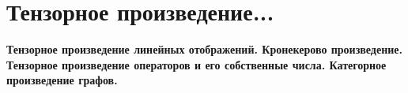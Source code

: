 \section{
 Тензорное произведение... %
}

\textbf{Тензорное произведение линейных отображений. Кронекерово произведение. Тензорное произведение операторов и его собственные числа. Категорное произведение графов.}
